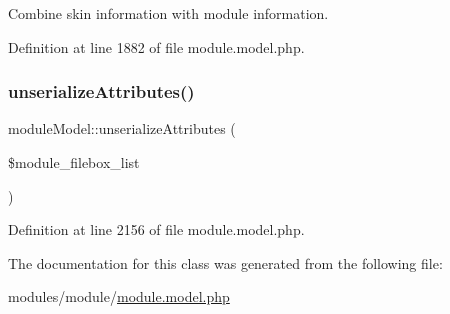 Combine skin information with module information. 



Definition at line 1882 of file module.\+model.\+php.

\hypertarget{classmoduleModel_a60ec88f0d61e7a44887bebba8048a18d}{}\label{classmoduleModel_a60ec88f0d61e7a44887bebba8048a18d} 
\subsubsection{\texorpdfstring{unserialize\+Attributes()}{unserializeAttributes()}}
{\footnotesize\ttfamily module\+Model\+::unserialize\+Attributes (\begin{DoxyParamCaption}\item[{}]{\$module\+\_\+filebox\+\_\+list }\end{DoxyParamCaption})}



Definition at line 2156 of file module.\+model.\+php.



The documentation for this class was generated from the following file\+:\begin{DoxyCompactItemize}
\item 
modules/module/\hyperlink{module_8model_8php}{module.\+model.\+php}\end{DoxyCompactItemize}
